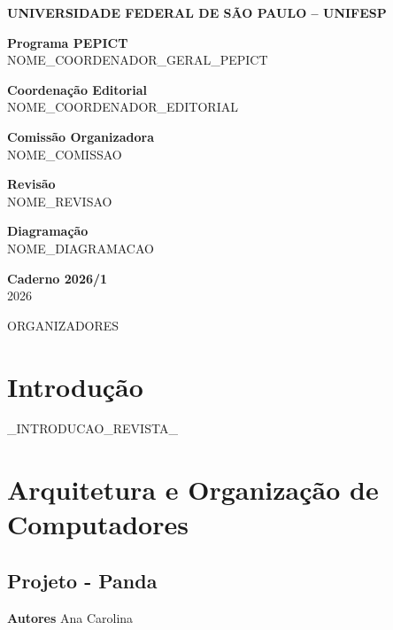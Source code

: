 \documentclass[12pt,openright,oneside,a4paper]{report}
\begin{document}
\begin{flushleft}
{\large \textbf{UNIVERSIDADE FEDERAL DE SÃO PAULO – UNIFESP}}
\vspace{1cm}

\textbf{Programa PEPICT} \\
NOME_COORDENADOR_GERAL_PEPICT
\vspace{0.7cm}

\textbf{Coordenação Editorial} \\
NOME_COORDENADOR_EDITORIAL
\vspace{0.7cm}

\textbf{Comissão Organizadora} \\
NOME_COMISSAO
\vspace{0.7cm}

\textbf{Revisão} \\
NOME_REVISAO
\vspace{0.7cm}

\textbf{Diagramação} \\
NOME_DIAGRAMACAO
\vspace{1.5cm}

\textbf{\large Caderno 2026/1} \\
2026
\vspace{0.5cm}

ORGANIZADORES
\end{flushleft}
\clearpage

\tableofcontents
\clearpage

\chapter{Introdução}
_INTRODUCAO_REVISTA_
\clearpage

\chapter{Arquitetura e Organização de Computadores}

\newpage
\section{Projeto - Panda}
\noindent
\textbf{Autores}
Ana Carolina
\end{document}
